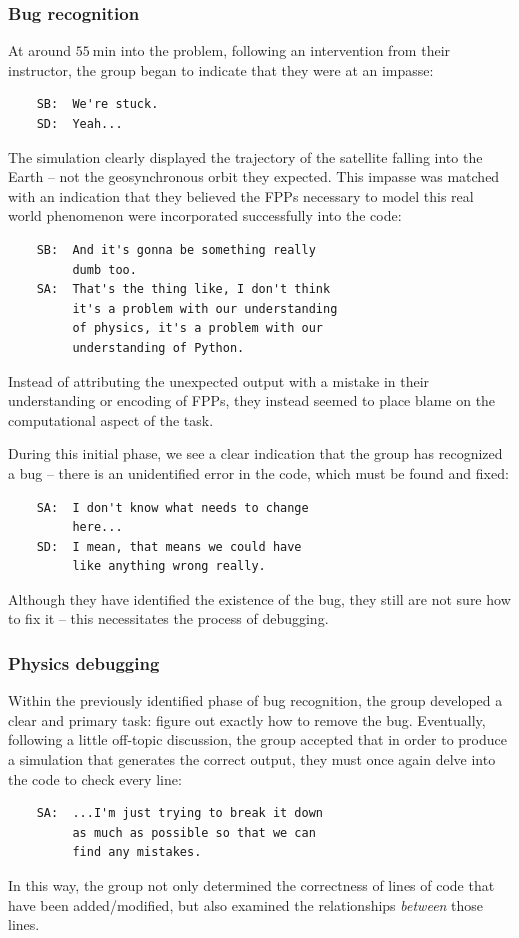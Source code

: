 \documentclass{msuphddissertation}
\begin{document}
\begin{doublespace}
\subsubsection{Bug recognition}

At around $\SI{55}{\minute}$ into the problem, following an intervention from their instructor, the group began to indicate that they were at an impasse:  \begin{verbatim}
    SB:  We're stuck.
    SD:  Yeah...
\end{verbatim}  The simulation clearly displayed the trajectory of the satellite falling into the Earth -- not the geosynchronous orbit they expected.  This impasse was matched with an indication that they believed the FPPs necessary to model this real world phenomenon were incorporated successfully into the code:  \begin{verbatim}
    SB:  And it's gonna be something really
         dumb too.
    SA:  That's the thing like, I don't think
         it's a problem with our understanding
         of physics, it's a problem with our
         understanding of Python.
\end{verbatim}  Instead of attributing the unexpected output with a mistake in their understanding or encoding of FPPs, they instead seemed to place blame on the computational aspect of the task.

During this initial phase, we see a clear indication that the group has recognized a bug -- there is an unidentified error in the code, which must be found and fixed:  \begin{verbatim}
    SA:  I don't know what needs to change
         here...
    SD:  I mean, that means we could have
         like anything wrong really.
\end{verbatim}  Although they have identified the existence of the bug, they still are not sure how to fix it -- this necessitates the process of debugging.

\subsubsection{Physics debugging}

Within the previously identified phase of bug recognition, the group developed a clear and primary task: figure out exactly how to remove the bug.  Eventually, following a little off-topic discussion, the group accepted that in order to produce a simulation that generates the correct output, they must once again delve into the code to check every line:  \begin{verbatim}
    SA:  ...I'm just trying to break it down
         as much as possible so that we can
         find any mistakes.
\end{verbatim}  In this way, the group not only determined the correctness of lines of code that have been added/modified, but also examined the relationships \emph{between} those lines.


\end{doublespace}
\end{document}
